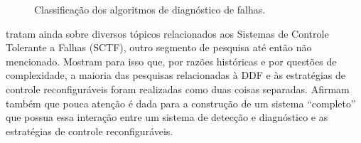 \begin{figure}[htb]
\centering
    \qquad
    \caption{Classificação dos algoritmos de diagnóstico de falhas.}
    \label{fig:arvore_venkatasu}
\end{figure}

 tratam ainda sobre diversos tópicos relacionados aos
Sistemas de Controle Tolerante a Falhas (SCTF), outro segmento de pesquisa até
então não mencionado. Mostram para isso que, por razões históricas e por
questões de complexidade, a maioria das pesquisas relacionadas à DDF e às
estratégias de controle reconfiguráveis foram realizadas como duas coisas
separadas. Afirmam também que pouca atenção é dada para a construção de um
sistema ``completo'' que possua essa interação entre um sistema de detecção e
diagnóstico e as estratégias de controle reconfiguráveis.


